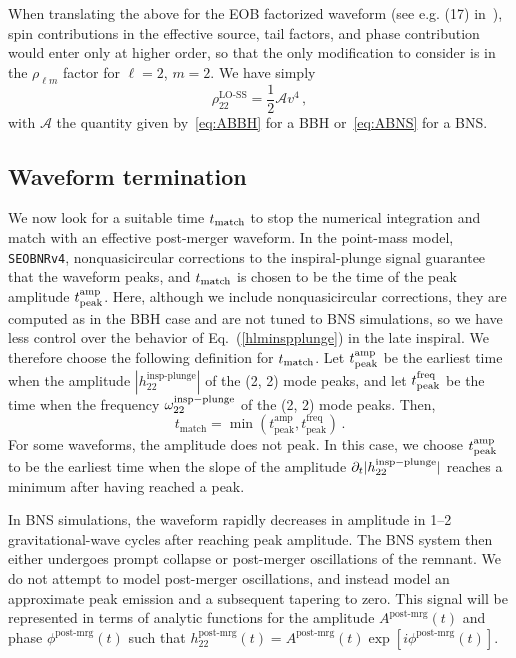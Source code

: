 \documentclass[prd,aps,letter,twocolumn,floatfix,notitlepage,nofootinbib]{revtex4-1}
\newcommand{\be}{\begin{equation}}
\newcommand{\ee}{\end{equation}}
\begin{document}
When translating the above for the EOB factorized waveform (see e.g. (17) in~\cite{Taracchini:2012ig}), spin contributions in the effective source, tail factors, and phase contribution would enter only at higher order, so that the only modification to consider is in the $\rho_{\ell m}$ factor for $\ell = 2$, $m = 2$. We have simply
\be\label{eq:rho22}
	\rho_{22}^{\textrm{LO-SS}} = \frac{1}{2}\mathcal{A} v^{4} \,,
\ee
with $\mathcal{A}$ the quantity given by~\eqref{eq:ABBH} for a BBH or~\eqref{eq:ABNS} for a BNS. 

\subsection{Waveform termination}

We now look for a suitable time $t_{\rm match}$ to stop the numerical integration and match with an effective post-merger waveform. In the point-mass model, \texttt{SEOBNRv4}, nonquasicircular corrections to the inspiral-plunge signal guarantee that the waveform peaks, and $t_{\rm match}$ is chosen to be the time of the peak amplitude $t_{\rm peak}^{\rm amp}$. Here, although we include nonquasicircular corrections, they are computed as in the BBH case and are not tuned to BNS simulations, so we have less control over the behavior of Eq.~(\ref{hlminspplunge}) in the late inspiral. We therefore choose the following definition for $t_{\rm match}$. Let $t_{\rm peak}^{\rm amp}$ be the earliest time when the amplitude $|h_{22}^{\textrm{insp-plunge}}|$ of the (2, 2) mode peaks, and let $t_{\rm peak}^{\rm freq}$ be the time when the frequency $\omega_{22}^{\rm insp-plunge}$ of the (2, 2) mode peaks. Then,
\begin{equation}
t_{\textrm{match}} = \min \left(t_{\textrm{peak}}^{\textrm{amp}},t_{\textrm{peak}}^{\textrm{freq}}\right)\,.\label{tmatch}
\end{equation}
For some waveforms, the amplitude does not peak. In this case, we choose $t_{\rm peak}^{\rm amp}$ to be the earliest time when the slope of the amplitude $\partial_t |h_{22}^{\rm insp-plunge}|$ reaches a minimum after having reached a peak.

In BNS simulations, the waveform rapidly decreases in amplitude in 1--2 gravitational-wave cycles after reaching peak amplitude. The BNS system then either undergoes prompt collapse or post-merger oscillations of the remnant. We do not attempt to model post-merger oscillations, and instead model an approximate peak emission and a subsequent tapering to zero. This signal will be represented in terms of analytic functions for the amplitude $A^{\textrm{post-mrg}}(t)$ and phase $\phi^{\textrm{post-mrg}}(t)$ such that $h_{22}^{\textrm{post-mrg}}(t) = A^{\textrm{post-mrg}}(t) \exp{[i\phi^{\textrm{post-mrg}}(t)]}$. 
\end{document}
